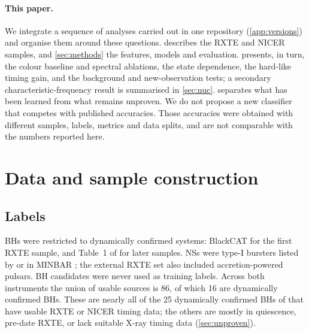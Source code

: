 \documentclass[11pt,a4paper]{article}
\begin{document}
\paragraph{This paper.}
We integrate a sequence of analyses carried out in one repository (\cref{app:versions}) and organise them around these
questions.  describes the RXTE and NICER samples, and \cref{sec:methods} the features, models and
evaluation.  presents, in turn, the colour baseline and spectral ablations, the state dependence, the
hard-like timing gain, and the background and new-observation tests; a secondary characteristic-frequency result is
summarised in \cref{sec:nuc}.  separates what has been learned from what remains unproven. We do not
propose a new classifier that competes with published accuracies. Those accuracies were obtained with different samples,
labels, metrics and data splits, and are not comparable with the numbers reported here.

\section{Data and sample construction}\label{sec:data}

\subsection{Labels}\label{sec:labels}
BHs were restricted to dynamically confirmed systems: BlackCAT \citep{CorralSantana2016} for the first RXTE sample, and
Table~1 of \citet{Marcel2026} for later samples. NSs were type-I bursters listed by \citet{Galloway2008} or in MINBAR
\citep{Galloway2020}; the external RXTE set also included accretion-powered pulsars. BH candidates were never used as
training labels. Across both instruments the union of usable sources is 86, of which 16 are dynamically confirmed BHs.
These are nearly all of the 25 dynamically confirmed BHs of \citet{Marcel2026} that have usable RXTE or NICER timing
data; the others are mostly in quiescence, pre-date RXTE, or lack suitable X-ray timing data (\cref{sec:unproven}).
\end{document}
